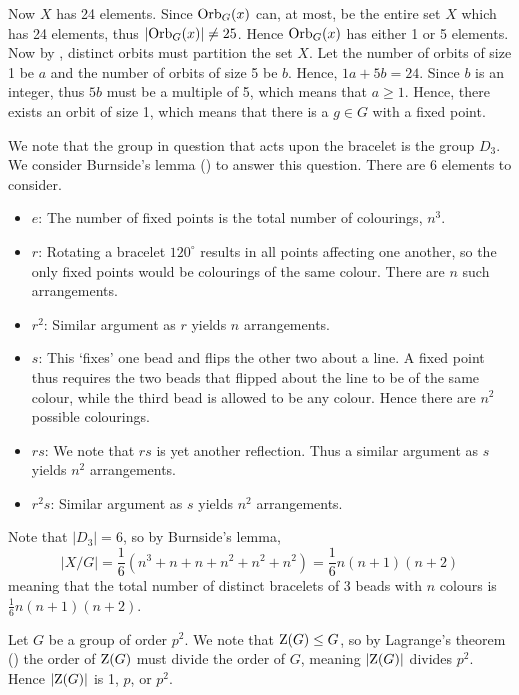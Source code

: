 \begin{questions}
    Now $X$ has 24 elements. Since $\mathrm{Orb}_{G}(x)$ can, at most, be the entire set $X$ which has 24 elements, thus $|\mathrm{Orb}_{G}(x)| \neq 25$. Hence $\mathrm{Orb}_{G}(x)$ has either 1 or 5 elements. Now by , distinct orbits must partition the set $X$. Let the number of orbits of size 1 be $a$ and the number of orbits of size 5 be $b$. Hence, $1a + 5b = 24$. Since $b$ is an integer, thus $5b$ must be a multiple of 5, which means that $a \geq 1$. Hence, there exists an orbit of size 1, which means that there is a $g \in G$ with a fixed point.

    \item We note that the group in question that acts upon the bracelet is the group $D_3$. We consider Burnside's lemma () to answer this question. There are 6 elements to consider.
    \begin{itemize}
        \item $\boxed{e}$: The number of fixed points is the total number of colourings, $n^3$.
        \item $\boxed{r}$: Rotating a bracelet $120^\circ$ results in all points affecting one another, so the only fixed points would be colourings of the same colour. There are $n$ such arrangements.
        \item $\boxed{r^2}$: Similar argument as $r$ yields $n$ arrangements.
        \item $\boxed{s}$: This `fixes' one bead and flips the other two about a line. A fixed point thus requires the two beads that flipped about the line to be of the same colour, while the third bead is allowed to be any colour. Hence there are $n^2$ possible colourings.
        \item $\boxed{rs}$: We note that $rs$ is yet another reflection. Thus a similar argument as $s$ yields $n^2$ arrangements.
        \item $\boxed{r^2s}$: Similar argument as $s$ yields $n^2$ arrangements.
    \end{itemize}
    Note that $|D_3| = 6$, so by Burnside's lemma,
    \[
        |X/G| = \frac16\left(n^3 + n + n + n^2 + n^2 + n^2\right) = \frac16 n(n+1)(n+2)
    \]
    meaning that the total number of distinct bracelets of 3 beads with $n$ colours is $\frac16 n(n+1)(n+2)$.

    \item Let $G$ be a group of order $p^2$. We note that $\mathrm{Z}(G) \leq G$, so by Lagrange's theorem () the order of $\mathrm{Z}(G)$ must divide the order of $G$, meaning $|\mathrm{Z}(G)|$ divides $p^2$. Hence $|\mathrm{Z}(G)|$ is 1, $p$, or $p^2$.


\end{questions}
